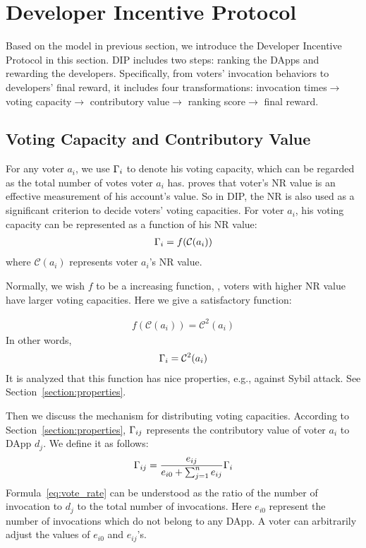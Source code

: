 \section{Developer Incentive Protocol}
\noindent Based on the model in previous section, we introduce the Developer
Incentive Protocol in this section. DIP includes two steps: ranking the DApps
and rewarding the developers. Specifically, from voters' invocation behaviors
to developers' final reward, it includes four transformations: invocation
times$\rightarrow$ voting capacity$\rightarrow$ contributory
value$\rightarrow$ ranking score$\rightarrow$ final reward.

\subsection{Voting Capacity and Contributory Value}
\noindent For any voter $a_i$, we use $\Gamma_i$ to denote his voting capacity, which can be regarded as the total number of votes voter $a_i$ has. \cite{Nebulasyellowpaper} proves that voter's NR value is an effective measurement of his account's value. So in DIP, the NR is also used as a significant criterion to decide voters' voting capacities. For voter $a_i$, his voting capacity can be represented as a function of his NR value:
\begin{align}
	\Gamma_i = f(\mathcal{C}(a_i))
\end{align}
where $\mathcal{C}(a_i)$ represents voter $a_i$'s NR value.


Normally, we wish $f$ to be a increasing function, \ie, voters with higher NR value have larger voting capacities. Here we give a satisfactory function:

\begin{align}
	f(\mathcal{C}(a_i))=\mathcal{C}^2(a_i)
\end{align}
In other words,
\begin{align}
	\Gamma_i = \mathcal{C}^2(a_i)
\end{align}
It is analyzed that this function has nice properties, e.g., against Sybil attack. See Section~\ref{section:properties}.

Then we discuss the mechanism for  distributing voting capacities. According to Section~\ref{section:properties}, $\Gamma_{ij}$ represents the contributory value of voter $a_i$ to DApp $d_j$. We define it as follows:
\begin{align}
	\label{eq:vote_rate}
	\Gamma_{ij} = \frac{e_{ij}}{e_{i0}+\sum_{j=1}^n {e_{ij}}} \Gamma_i
\end{align}
Formula~\ref{eq:vote_rate} can be understood as the ratio of the number of invocation to $d_j$ to the total number of invocations. Here $e_{i0}$ represent the number of invocations which do not belong to any DApp. A voter can arbitrarily adjust the values of $e_{i0}$ and $e_{ij}$'s.


